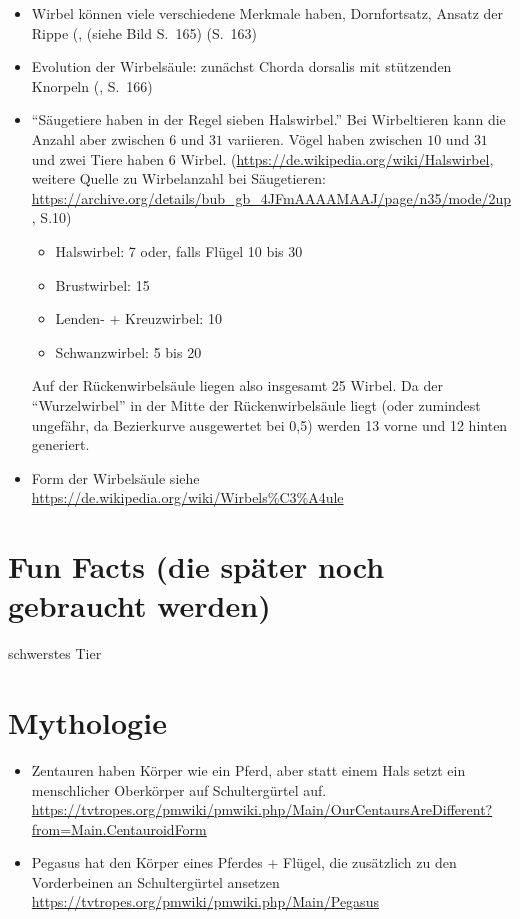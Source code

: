 \begin{itemize}
 \item Wirbel können viele verschiedene Merkmale haben, \zb Dornfortsatz, Ansatz der Rippe (\cite{Vergleichende_Anatomie}, (siehe Bild S.\ 165) (S.\ 163)
 
 \item Evolution der Wirbelsäule: zunächst Chorda dorsalis mit stützenden Knorpeln (\cite{Vergleichende_Anatomie}, S.\ 166)
 
  \item "`Säugetiere haben in der Regel sieben Halswirbel."' Bei Wirbeltieren kann die Anzahl aber zwischen $6$ und $31$ variieren. Vögel haben zwischen $10$ und $31$ und zwei Tiere haben $6$ Wirbel. (\url{https://de.wikipedia.org/wiki/Halswirbel}, weitere Quelle zu Wirbelanzahl bei Säugetieren: \url{https://archive.org/details/bub_gb_4JFmAAAAMAAJ/page/n35/mode/2up}, S.10)
    \begin{itemize}
     \item Halswirbel: 7 oder, falls Flügel 10 bis 30
     \item Brustwirbel: 15
     \item Lenden- + Kreuzwirbel: 10
     \item Schwanzwirbel: 5 bis 20
    \end{itemize}
 Auf der Rückenwirbelsäule liegen also insgesamt 25 Wirbel.   
 Da der "`Wurzelwirbel"' in der Mitte der Rückenwirbelsäule liegt (oder zumindest ungefähr, da Bezierkurve ausgewertet bei 0,5) werden 13 vorne und 12 hinten generiert.

 \item Form der Wirbelsäule siehe \url{https://de.wikipedia.org/wiki/Wirbels\%C3\%A4ule}
\end{itemize}


\section{Fun Facts (die später noch gebraucht werden)}

\zb schwerstes Tier


\section{Mythologie}

\begin{itemize}
 \item Zentauren haben Körper wie ein Pferd, aber statt einem Hals setzt ein menschlicher Oberkörper auf Schultergürtel auf.\\
 \url{https://tvtropes.org/pmwiki/pmwiki.php/Main/OurCentaursAreDifferent?from=Main.CentauroidForm}
 \item Pegasus hat den Körper eines Pferdes + Flügel, die zusätzlich zu den Vorderbeinen an Schultergürtel ansetzen\\
 \url{https://tvtropes.org/pmwiki/pmwiki.php/Main/Pegasus}
\end{itemize}


